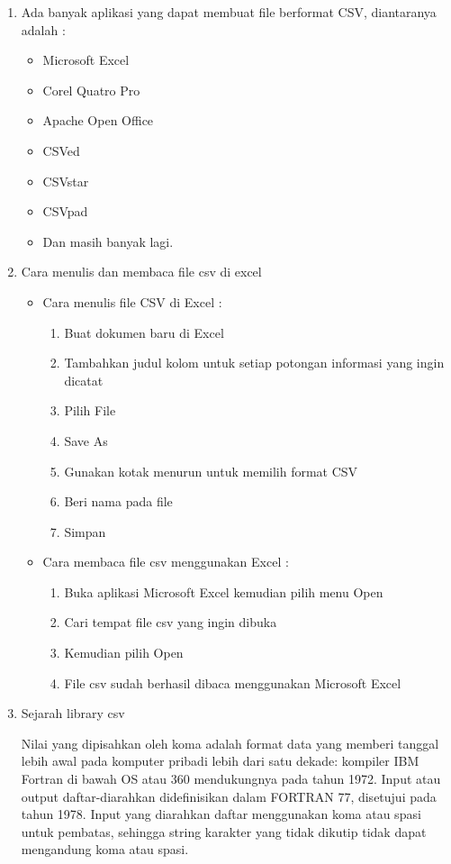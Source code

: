 \begin{enumerate}
	
	\item Ada banyak aplikasi yang dapat membuat file berformat CSV, diantaranya adalah :
				\begin{itemize}
					\item Microsoft Excel
					\item Corel Quatro Pro
					\item Apache Open Office
					\item CSVed
					\item CSVstar
					\item CSVpad
					\item Dan masih banyak lagi.
				\end{itemize}
		\item Cara menulis dan membaca file csv di excel		
	\begin{itemize}
	\item Cara menulis file CSV di Excel :
				\begin{enumerate}
					\item Buat dokumen baru di Excel
					\item Tambahkan judul kolom untuk setiap potongan informasi yang ingin dicatat
					\item Pilih File
					\item Save As
					\item Gunakan kotak menurun untuk memilih format CSV 
					\item Beri nama pada file
					\item Simpan
				\end{enumerate}
	\item Cara membaca file csv menggunakan Excel :
				\begin{enumerate}
					\item Buka aplikasi Microsoft Excel kemudian pilih menu Open
					\item Cari tempat file csv yang ingin dibuka 
					\item Kemudian pilih Open
					\item File csv sudah berhasil dibaca menggunakan Microsoft Excel
				\end{enumerate}
	\end{itemize}
	\item Sejarah library csv
		\par Nilai yang dipisahkan oleh koma adalah format data yang memberi tanggal lebih awal pada komputer pribadi lebih dari satu dekade: kompiler IBM Fortran di bawah OS atau 360 mendukungnya pada tahun 1972. Input atau output daftar-diarahkan didefinisikan dalam FORTRAN 77, disetujui pada tahun 1978. Input yang diarahkan daftar menggunakan koma atau spasi untuk pembatas, sehingga string karakter yang tidak dikutip tidak dapat mengandung koma atau spasi.
		

\end{enumerate}

